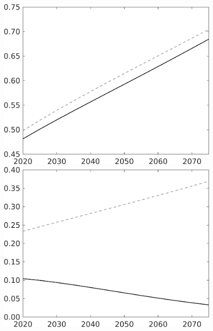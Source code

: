 \documentclass[12pt]{article}
\begin{document}
\begin{figure}[h!!]
\begin{minipage}[]{0.32\textwidth}
\end{minipage}	
	\begin{minipage}[]{0.32\textwidth}
		\includegraphics[width=1\textwidth]{../../codding_model/own_basedOnFried/optimalPol_010922_revision/figures/all_13Sept22/LevTaufNoTauf_TaulCalib_Equlab_regime0_C_spillover0_nsk0_xgr1_knspil1_sep1_LFlimit0_emsbase0_countec0_GovRev0_etaa0.79_lgd0.png}
	\end{minipage}	
	\begin{minipage}[]{0.32\textwidth}
		\includegraphics[width=1\textwidth]{../../codding_model/own_basedOnFried/optimalPol_010922_revision/figures/all_13Sept22/LevTaufNoTauf_TaulCalib_Equlab_regime0_F_spillover0_nsk0_xgr1_knspil1_sep1_LFlimit0_emsbase0_countec0_GovRev0_etaa0.79_lgd0.png}

\end{minipage}
\end{figure}
\end{document}
